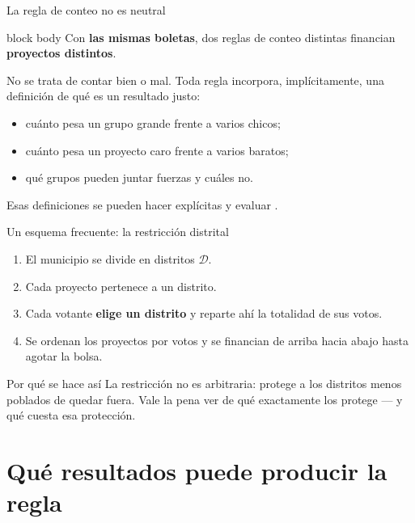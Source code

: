 \documentclass[11pt, aspectratio=169]{beamer}
\newcommand{\Dist}{\mathcal{D}}         %
\newcommand{\keybox}[1]{%
  \begin{beamercolorbox}[wd=\textwidth, sep=10pt]{block body}
    \centering #1
  \end{beamercolorbox}}
\begin{document}
\begin{frame}{La regla de conteo no es neutral}
  \keybox{Con \textbf{las mismas boletas}, dos reglas de conteo distintas
    financian \textbf{proyectos distintos}.}

  \vspace{0.5em}
  No se trata de contar bien o mal. Toda regla incorpora, implícitamente, una
  definición de qué es un resultado justo:

  \begin{itemize}
    \item cuánto pesa un grupo grande frente a varios chicos;
    \item cuánto pesa un proyecto caro frente a varios baratos;
    \item qué grupos pueden juntar fuerzas y cuáles no.
  \end{itemize}

  \vspace{0.4em}
  Esas definiciones se pueden hacer explícitas y evaluar \citep{peters2021}.
\end{frame}

\begin{frame}{Un esquema frecuente: la restricción distrital}
  \begin{enumerate}
    \item El municipio se divide en distritos $\Dist$.
    \item Cada proyecto pertenece a un distrito.
    \item Cada votante \textbf{elige un distrito} y reparte ahí la totalidad de
      sus votos.
    \item Se ordenan los proyectos por votos y se financian de arriba hacia
      abajo hasta agotar la bolsa.
  \end{enumerate}

  \vspace{0.5em}
  \begin{block}{Por qué se hace así}
    La restricción no es arbitraria: protege a los distritos menos poblados de
    quedar fuera. Vale la pena ver de qué exactamente los protege --- y qué
    cuesta esa protección.
  \end{block}
\end{frame}

\section{Qué resultados puede producir la regla}
\end{document}
